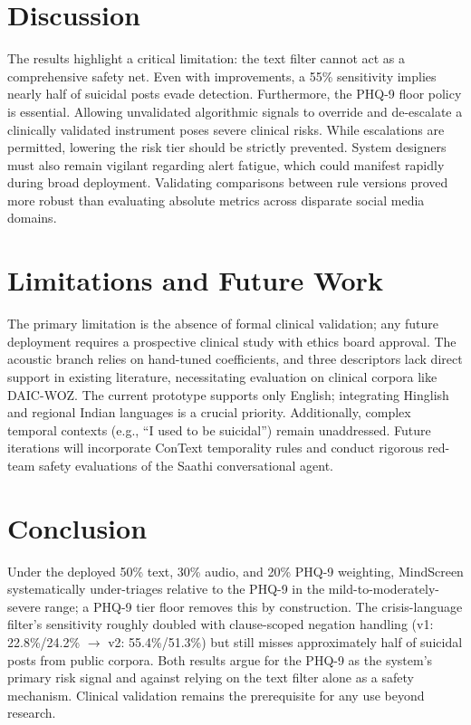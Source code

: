 \documentclass[conference]{IEEEtran}
\begin{document}
\section{Discussion}
The results highlight a critical limitation: the text filter cannot act as a comprehensive safety net. Even with improvements, a 55\% sensitivity implies nearly half of suicidal posts evade detection. Furthermore, the PHQ-9 floor policy is essential. Allowing unvalidated algorithmic signals to override and de-escalate a clinically validated instrument poses severe clinical risks. While escalations are permitted, lowering the risk tier should be strictly prevented. System designers must also remain vigilant regarding alert fatigue, which could manifest rapidly during broad deployment. Validating comparisons between rule versions proved more robust than evaluating absolute metrics across disparate social media domains.

\section{Limitations and Future Work}
The primary limitation is the absence of formal clinical validation; any future deployment requires a prospective clinical study with ethics board approval. The acoustic branch relies on hand-tuned coefficients, and three descriptors lack direct support in existing literature, necessitating evaluation on clinical corpora like DAIC-WOZ. The current prototype supports only English; integrating Hinglish and regional Indian languages is a crucial priority. Additionally, complex temporal contexts (e.g., ``I used to be suicidal'') remain unaddressed. Future iterations will incorporate ConText temporality rules and conduct rigorous red-team safety evaluations of the Saathi conversational agent.

\section{Conclusion}
Under the deployed 50\% text, 30\% audio, and 20\% PHQ-9 weighting, MindScreen systematically under-triages relative to the PHQ-9 in the mild-to-moderately-severe range; a PHQ-9 tier floor removes this by construction. The crisis-language filter's sensitivity roughly doubled with clause-scoped negation handling (v1: 22.8\%/24.2\% $\to$ v2: 55.4\%/51.3\%) but still misses approximately half of suicidal posts from public corpora. Both results argue for the PHQ-9 as the system's primary risk signal and against relying on the text filter alone as a safety mechanism. Clinical validation remains the prerequisite for any use beyond research.
\end{document}
